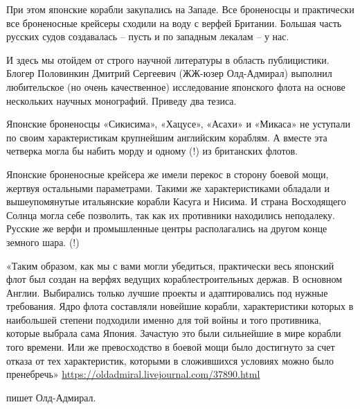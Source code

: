При этом японские корабли закупались на Западе. Все броненосцы и практически все броненосные крейсеры сходили на воду с верфей Британии. Большая часть русских судов создавалась – пусть и по западным лекалам – у нас.

И здесь мы отойдем от строго научной литературы в область публицистики. Блогер Половинкин Дмитрий Сергеевич (ЖЖ-юзер Олд-Адмирал) выполнил любительское (но очень качественное) исследование японского флота на основе нескольких научных монографий. Приведу два тезиса.

Японские броненосцы «Сикисима», «Хацусе», «Асахи» и «Микаса» не уступали по своим характеристикам крупнейшим английским кораблям. А вместе эта четверка могла бы набить морду и одному (!) из британских флотов.

Японские броненосные крейсера же имели перекос в сторону боевой мощи, жертвуя остальными параметрами. Такими же характеристиками обладали и вышеупомянутые итальянские корабли Касуга и Нисима. И страна Восходящего Солнца могла себе позволить, так как их противники находились неподалеку. Русские же верфи и промышленные центры располагались на другом конце земного шара. (!)

\begin{textcitation}
«Таким образом, как мы с вами могли убедиться, практически весь японский флот был создан на верфях ведущих кораблестроительных держав. В основном Англии. Выбирались только лучшие проекты и адаптировались под нужные требования. Ядро флота составляли новейшие корабли, характеристики которых в наибольшей степени подходили именно для той войны и того противника, которые выбрала сама Япония. Зачастую это были сильнейшие в мире корабли того времени. Или же превосходство в боевой мощи было достигнуто за счет отказа от тех характеристик, которыми в сложившихся условиях можно было пренебречь» \url{https://oldadmiral.livejournal.com/37890.html}
\end{textcitation}
пишет Олд-Адмирал.

